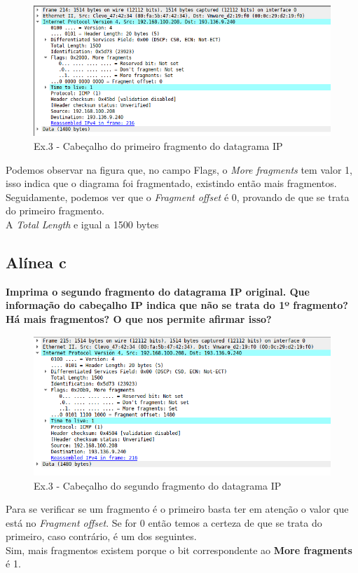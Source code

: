 \documentclass[a4paper]{report}
\begin{document}
\begin{figure}[H]
    \centering 
    \includegraphics[width=\textwidth]{images/fragmentDatagramaIpEx3.png}
    \caption{Ex.3 - Cabeçalho do primeiro fragmento do datagrama IP}
    \label{fig:fragmentDatagramaIpEx3}
\end{figure}
Podemos observar na figura que, no campo Flags, o \textit{More fragments} tem
valor 1, isso indica que o diagrama foi fragmentado, existindo então mais
fragmentos.\\
Seguidamente, podemos ver que o \textit{Fragment offset} é 0, provando de que se
trata do primeiro fragmento.\\
A \textit{Total Length} e igual a 1500 bytes

\subsection{Alínea c}
\textbf{Imprima o segundo fragmento do datagrama IP original. Que
informação do cabeçalho IP indica que não se trata do 1º fragmento? 
Há mais fragmentos? O que nos permite afirmar isso?}

\begin{figure}[H]
    \centering 
    \includegraphics[width=\textwidth]{images/fragment2DatagramaIpEx3.png}
    \caption{Ex.3 - Cabeçalho do segundo fragmento do datagrama IP}
    \label{fig:fragment2DatagramaIpEx3}
\end{figure}
Para se verificar se um fragmento é o primeiro basta ter em atenção o valor
que está no \textit{Fragment offset}. Se for 0 então temos a certeza de que se
trata do primeiro, caso contrário, é um dos seguintes.\\
Sim, mais fragmentos existem porque o bit correspondente ao \textbf{More
fragments} é
1.
\end{document}
